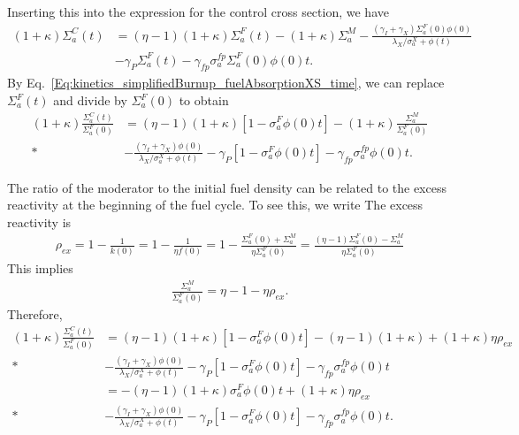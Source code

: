 Inserting this into the expression for the control cross section, we have
\begin{align}
    (1 + \kappa) \Sigma_a^C(t) &= ( \eta - 1 ) (1 + \kappa) \Sigma_a^F(t) -  (1 + \kappa) \Sigma_a^M - \frac{ ( \gamma_I + \gamma_X ) \Sigma_a^F(0) \phi(0) }{ \lambda_X / \sigma_a^X + \phi(t) } \nonumber \\
   &- \gamma_P \Sigma_a^F(t) - \gamma_{fp}  \sigma_a^{fp} \Sigma_a^F(0) \phi(0) t .
\end{align}
By Eq.~\eqref{Eq:kinetics_simplifiedBurnup_fuelAbsorptionXS_time}, we can replace $\Sigma_a^F(t)$ and divide by $\Sigma_a^F(0)$ to obtain
\begin{align}
    (1 + \kappa) \frac{\Sigma_a^C(t)}{\Sigma_a^F(0)} &= ( \eta - 1 ) (1 + \kappa)\left[ 1 - \sigma_a^F \phi(0) t \right] -  (1 + \kappa) \frac{\Sigma_a^M}{\Sigma_a^F(0)} \nonumber \\*
    &- \frac{ ( \gamma_I + \gamma_X )  \phi(0) }{ \lambda_X / \sigma_a^X + \phi(t) } 
     - \gamma_P  \left[ 1 - \sigma_a^F \phi(0) t \right] - \gamma_{fp} \sigma_a^{fp} \phi(0) t .
\end{align}

The ratio of the moderator to the initial fuel density can be related to the excess reactivity at the beginning of the fuel cycle. To see this, we write
The excess reactivity is
\begin{align}
  \rho_{ex} = 1 - \frac{1}{k(0)} = 1 - \frac{1}{\eta f(0)} 
  = 1 - \frac{\Sigma_a^F(0) + \Sigma_a^M}{\eta \Sigma_a^F(0)}
  = \frac{ (\eta-1) \Sigma_a^F(0) - \Sigma_a^M}{ \eta \Sigma_a^F(0)} 
\end{align}
This implies
\begin{align}
   \frac{\Sigma_a^M}{\Sigma_a^F(0)} = \eta - 1 - \eta \rho_{ex} .
\end{align}
Therefore,
\begin{align}
    (1 + \kappa) \frac{\Sigma_a^C(t)}{\Sigma_a^F(0)} 
    &= ( \eta - 1 ) (1 + \kappa)\left[ 1 - \sigma_a^F \phi(0) t \right] -  (\eta - 1 )(1 + \kappa) + ( 1 + \kappa ) \eta \rho_{ex} \nonumber \\*
    &- \frac{ ( \gamma_I + \gamma_X )  \phi(0) }{ \lambda_X / \sigma_a^X + \phi(t) } 
     - \gamma_P  \left[ 1 - \sigma_a^F \phi(0) t \right] - \gamma_{fp} \sigma_a^{fp} \phi(0) t \nonumber \\
    &= -( \eta - 1 ) (1 + \kappa)  \sigma_a^F \phi(0) t   + ( 1 + \kappa ) \eta \rho_{ex} \nonumber \\*
    &- \frac{ ( \gamma_I + \gamma_X )  \phi(0) }{ \lambda_X / \sigma_a^X + \phi(t) } 
     - \gamma_P  \left[ 1 - \sigma_a^F \phi(0) t \right] - \gamma_{fp} \sigma_a^{fp} \phi(0) t .
\end{align}

